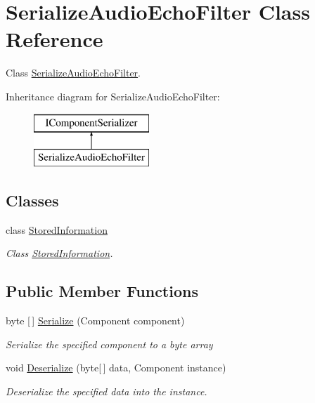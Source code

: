 \hypertarget{class_serialize_audio_echo_filter}{}\section{Serialize\+Audio\+Echo\+Filter Class Reference}
\label{class_serialize_audio_echo_filter}


Class \hyperlink{class_serialize_audio_echo_filter}{Serialize\+Audio\+Echo\+Filter}.  


Inheritance diagram for Serialize\+Audio\+Echo\+Filter\+:\begin{figure}[H]
\begin{center}
\leavevmode
\includegraphics[height=2.000000cm]{class_serialize_audio_echo_filter}
\end{center}
\end{figure}
\subsection*{Classes}
\begin{DoxyCompactItemize}
\item 
class \hyperlink{class_serialize_audio_echo_filter_1_1_stored_information}{Stored\+Information}
\begin{DoxyCompactList}\small\item\em Class \hyperlink{class_serialize_audio_echo_filter_1_1_stored_information}{Stored\+Information}. \end{DoxyCompactList}\end{DoxyCompactItemize}
\subsection*{Public Member Functions}
\begin{DoxyCompactItemize}
\item 
byte \mbox{[}$\,$\mbox{]} \hyperlink{class_serialize_audio_echo_filter_a05a44375abc89e383547960120fb55e6}{Serialize} (Component component)
\begin{DoxyCompactList}\small\item\em Serialize the specified component to a byte array \end{DoxyCompactList}\item 
void \hyperlink{class_serialize_audio_echo_filter_ad5beda12b5d39b678ce291ee1c13374c}{Deserialize} (byte\mbox{[}$\,$\mbox{]} data, Component instance)
\begin{DoxyCompactList}\small\item\em Deserialize the specified data into the instance. \end{DoxyCompactList}\end{DoxyCompactItemize}


